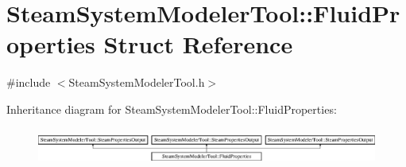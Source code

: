 \hypertarget{struct_steam_system_modeler_tool_1_1_fluid_properties}{}\section{Steam\+System\+Modeler\+Tool\+:\+:Fluid\+Properties Struct Reference}
\label{struct_steam_system_modeler_tool_1_1_fluid_properties}


{\ttfamily \#include $<$Steam\+System\+Modeler\+Tool.\+h$>$}

Inheritance diagram for Steam\+System\+Modeler\+Tool\+:\+:Fluid\+Properties\+:\begin{figure}[H]
\begin{center}
\leavevmode
\includegraphics[height=1.244444cm]{d9/dd3/struct_steam_system_modeler_tool_1_1_fluid_properties}
\end{center}
\end{figure}

